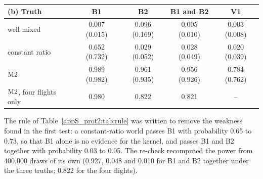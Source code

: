 \begin{table}[tbp]
  \medskip
  \begin{tabular}{@{}lcccc@{}}
    \toprule
    (b) Truth & B1 & B2 & B1 and B2 & V1 \\
    \midrule
    well mixed       & 0.007 (0.015) & 0.096 (0.169) & 0.005 (0.010) & 0.003 (0.008) \\
    constant ratio   & 0.652 (0.732) & 0.029 (0.052) & 0.028 (0.049) & 0.020 (0.039) \\
    $\mathrm{M2}$          & 0.989 (0.982) & 0.961 (0.935) & 0.956 (0.926) & 0.784 (0.762) \\
    \midrule
    $\mathrm{M2}$, four flights only & 0.980 & 0.822 & 0.821 & -- \\
    \bottomrule
  \end{tabular}
\end{table}

The rule of Table~\ref{appS_prot2:tab:rule} was written to remove the weakness found in the first test: a
constant-ratio world passes B1 with probability 0.65 to 0.73, so that B1 alone is no evidence for the
kernel, and passes B1 and B2 together with probability 0.03 to 0.05. The re-check recomputed the
power from 400{,}000 draws of its own (0.927, 0.048 and 0.010 for B1 and B2 together under the three truths;
0.822 for the four flights).

